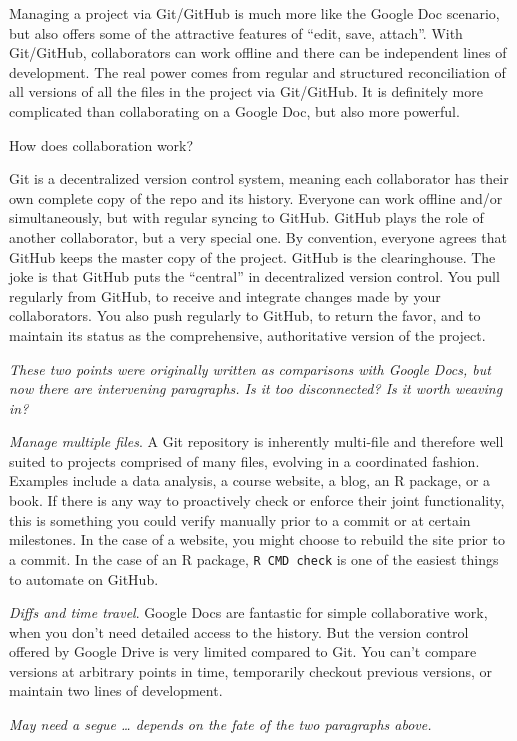 \documentclass[12pt]{article}
\begin{document}
Managing a project via Git/GitHub is much more like the Google Doc
scenario, but also offers some of the attractive features of ``edit,
save, attach''. With Git/GitHub, collaborators can work offline and
there can be independent lines of development. The real power comes from
regular and structured reconciliation of all versions of all the files
in the project via Git/GitHub. It is definitely more complicated than
collaborating on a Google Doc, but also more powerful.

How does collaboration work?

Git is a decentralized version control system, meaning each collaborator
has their own complete copy of the repo and its history. Everyone can
work offline and/or simultaneously, but with regular syncing to GitHub.
GitHub plays the role of another collaborator, but a very special one.
By convention, everyone agrees that GitHub keeps the master copy of the
project. GitHub is the clearinghouse. The joke is that GitHub puts the
``central'' in decentralized version control. You pull regularly from
GitHub, to receive and integrate changes made by your collaborators. You
also push regularly to GitHub, to return the favor, and to maintain its
status as the comprehensive, authoritative version of the project.

\emph{These two points were originally written as comparisons with
Google Docs, but now there are intervening paragraphs. Is it too
disconnected? Is it worth weaving in?}

\emph{Manage multiple files}. A Git repository is inherently multi-file
and therefore well suited to projects comprised of many files, evolving
in a coordinated fashion. Examples include a data analysis, a course
website, a blog, an R package, or a book. If there is any way to
proactively check or enforce their joint functionality, this is
something you could verify manually prior to a commit or at certain
milestones. In the case of a website, you might choose to rebuild the
site prior to a commit. In the case of an R package,
\texttt{R\ CMD\ check} is one of the easiest things to automate on
GitHub.

\emph{Diffs and time travel}. Google Docs are fantastic for simple
collaborative work, when you don't need detailed access to the history.
But the version control offered by Google Drive is very limited compared
to Git. You can't compare versions at arbitrary points in time,
temporarily checkout previous versions, or maintain two lines of
development.

\emph{May need a segue \ldots{} depends on the fate of the two
paragraphs above.}
\end{document}
